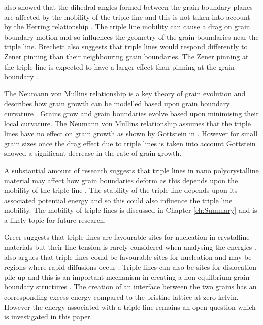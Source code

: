 \documentclass[12pt,a4paper,openany]{report}
\begin{document}
\citeauthor{GOTTSTEIN2010914} also  showed that the dihedral angles formed between the grain boundary planes are affected by the mobility of the triple line and this is not taken into account by the Herring relationship \cite{GOTTSTEIN2010914}. The triple line mobility can cause a drag on grain boundary motion and so influences the geometry of the grain boundaries near the triple line. Brechett also suggests that triple lines would respond differently to Zener pinning than their neighbouring grain boundaries. The Zener pinning at the triple line is expected to have a larger effect than pinning at the grain boundary \cite{BRECHET2010910}.

The Neumann von Mullins relationship is a key theory of grain evolution and describes how grain growth can be modelled based upon grain boundary curvature \cite{Lazar2011}. Grains grow and grain boundaries evolve based upon minimising their local curvature. The Neumann von Mullins relationship assumes that the triple lines have no effect on grain growth as shown by Gottstein in \cite{GOTTSTEIN2010914}. However for small grain sizes once the drag effect due to triple lines is taken into account Gottstein showed a significant decrease in the rate of grain growth.

A substantial amount of research suggests that triple lines in nano polycrystalline material may affect how grain boundaries deform as this depends upon the mobility of the triple line \cite{Shvindlerman2005,BRECHET2010910, Fischer2012,
GOTTSTEIN2000, ZOLLNER201241, Miessen2015, Thomas2019}. The stability of the triple line depends upon its associated potential energy and so this could also influence the triple line mobility. The mobility of triple lines is discussed in Chapter \ref{ch:Summary} and is a likely topic for future research. 

Greer suggests that triple lines are favourable sites for nucleation in crystalline materials but their line tension is rarely considered when analysing the energies   \cite{GREER2010899}. \citeauthor{King2010} also argues that triple lines could be favourable sites for nucleation and may be   regions where rapid diffusions occur \cite{King2010}. Triple lines can also be sites for dislocation pile up and this is an important mechanism in creating a non-equilbrium grain boundary structures \cite{Nazarov1993}. The creation of an interface between the two grains has an corresponding excess energy compared to the pristine lattice at zero kelvin. However the energy associated with a triple line remains an open question which is investigated in this paper.
\end{document}
